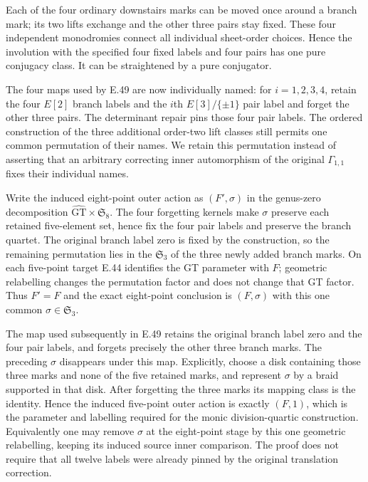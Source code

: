 Each of the four ordinary downstairs marks can be moved once around
a branch mark; its two lifts exchange and the other three pairs stay
fixed.  These four independent monodromies connect all individual
sheet-order choices.  Hence the involution with the specified four
fixed labels and four pairs has one pure conjugacy class.  It can be
straightened by a pure conjugator.

The four maps used by E.49 are now individually named: for
$i=1,2,3,4$, retain the four $E[2]$ branch labels and the $i$th
$E[3]/\{\pm1\}$ pair label and forget the other three pairs.
The determinant repair pins those four pair labels.  The ordered
construction of the three additional order-two lift classes still
permits one common permutation of their names.  We retain this
permutation instead of asserting that an arbitrary correcting
inner automorphism of the original $\Gamma_{1,1}$ fixes their
individual names.

Write the induced eight-point outer action as $(F',\sigma)$ in
the genus-zero decomposition
$\widehat{\mathrm{GT}}\times\mathfrak S_8$.
The four forgetting kernels make $\sigma$ preserve each retained
five-element set, hence fix the four pair labels and preserve the
branch quartet.  The original branch label zero is fixed by the
construction, so the remaining permutation lies in the
$\mathfrak S_3$ of the three newly added branch marks.
On each five-point target E.44 identifies the GT parameter with
$F$; geometric relabelling changes the permutation factor and
does not change that GT factor.  Thus $F'=F$ and the exact
eight-point conclusion is $(F,\sigma)$ with this one common
$\sigma\in\mathfrak S_3$.

The map used subsequently in E.49 retains the original branch
label zero and the four pair labels, and forgets precisely the
other three branch marks.  The preceding $\sigma$ disappears
under this map.  Explicitly, choose a disk containing those three
marks and none of the five retained marks, and represent $\sigma$
by a braid supported in that disk.  After forgetting the three
marks its mapping class is the identity.  Hence the induced
five-point outer action is exactly $(F,1)$, which is the parameter
and labelling required for the monic division-quartic construction.
Equivalently one may remove $\sigma$ at the eight-point stage by
this one geometric relabelling, keeping its induced source inner
comparison.  The proof does not require that all twelve labels
were already pinned by the original translation correction.

